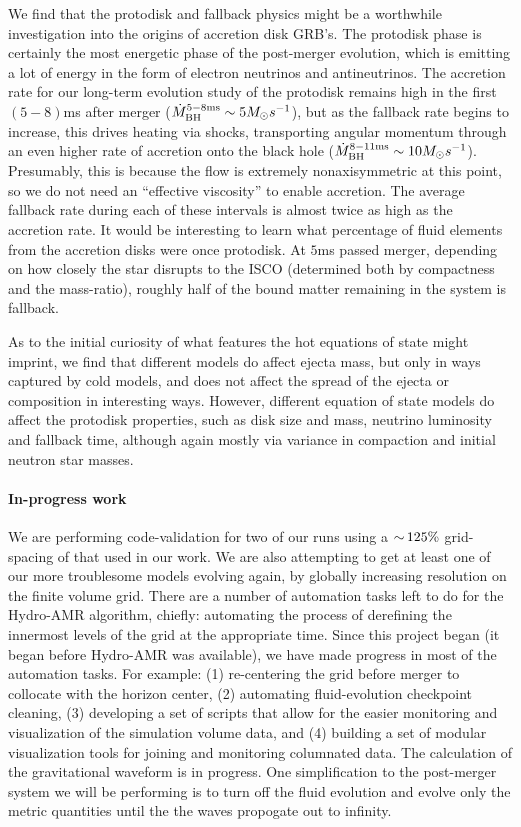 We find that the protodisk and fallback physics might be a worthwhile investigation into the origins of accretion disk GRB's.
The protodisk phase is certainly the most energetic phase of the post-merger evolution, which is emitting a lot of energy in the form of electron neutrinos and antineutrinos. 
The accretion rate for our long-term evolution study of the protodisk remains high in the first $(5-8)$ms after merger ($\dot{M}^{5-8 {\rm ms}}_{\rm BH} \sim 5 M_\odot s^{-1}$), but as the fallback rate begins to increase, this drives heating via shocks, transporting angular momentum through an even higher rate of accretion onto the black hole ($\dot{M}^{8-11 {\rm ms}}_{\rm BH} \sim 10 M_\odot s^{-1}$).
Presumably, this is because the flow is extremely nonaxisymmetric at this point, so we do not need an ``effective viscosity'' to enable accretion.
The average fallback rate during each of these intervals is almost twice as high as the accretion rate.
It would be interesting to learn what percentage of fluid elements from the accretion disks were once protodisk.
At $5$ms passed merger, depending on how closely the star disrupts to the ISCO (determined both by compactness and the mass-ratio), roughly half of the bound matter remaining in the system is fallback.

As to the initial curiosity of what features the hot equations of state might imprint, we find that different models do affect ejecta mass, but only in ways captured by cold models, and does not affect the spread of the ejecta or composition in interesting ways.
However, different equation of state models do affect the protodisk properties, such as disk size and mass, neutrino luminosity and fallback time, although again mostly via variance in compaction and initial neutron star masses.
 

\paragraph{In-progress work}

We are performing code-validation for two of our runs using a $\mathord{\sim}\,125\%$ grid-spacing of that used in our work.
We are also attempting to get at least one of our more troublesome models evolving again, by globally increasing resolution on the finite volume grid.
There are a number of automation tasks left to do for the Hydro-AMR algorithm, chiefly: automating the process of derefining the innermost levels of the grid at the appropriate time.
Since this project began (it began before Hydro-AMR was available), we have made progress in most of the automation tasks. For example:
(1) re-centering the grid before merger to collocate with the horizon center, 
(2) automating fluid-evolution checkpoint cleaning, 
(3) developing a set of scripts that allow for the easier monitoring and visualization of the simulation volume data, 
and (4) building a set of modular visualization tools for joining and monitoring columnated data.
The calculation of the gravitational waveform is in progress.
One simplification to the post-merger system we will be performing is to turn off the fluid evolution and evolve only the metric quantities until the the waves propogate out to infinity.

